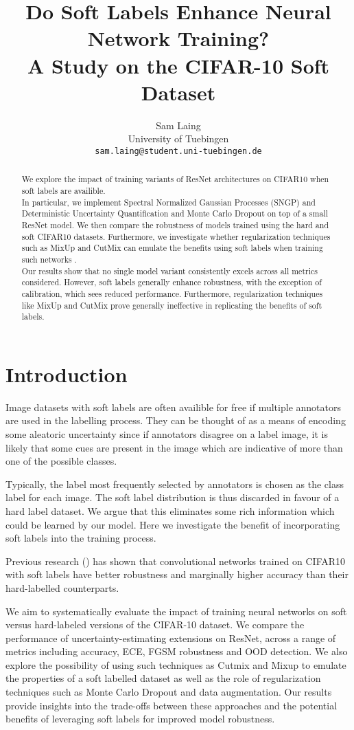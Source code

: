 \documentclass{article}
\title{Do Soft Labels Enhance Neural Network Training? \\ A Study on the CIFAR-10 Soft Dataset}
\author{
	Sam Laing \\
	University of Tuebingen\\
	\texttt{sam.laing@student.uni-tuebingen.de}
}
\begin{document}
\maketitle


\begin{abstract}
	We explore the impact of training variants of ResNet architectures on CIFAR10 when soft labels are availible.  \\
	In particular, we implement Spectral Normalized Gaussian Processes (SNGP) and Deterministic Uncertainty Quantification and Monte Carlo Dropout on top of a small ResNet model. We then compare the robustness of models trained using the hard and soft CIFAR10 datasets.
	Furthermore, we investigate whether regularization techniques such as MixUp and CutMix can emulate the benefits using soft labels when training such networks . \\
	Our results show that no single model variant consistently excels across all metrics considered. However, soft labels generally enhance robustness, with the exception of calibration, which sees reduced performance. Furthermore, regularization techniques like MixUp and CutMix prove generally ineffective in replicating the benefits of soft labels.
\end{abstract}
\section{Introduction}
Image datasets with soft labels are often availible for free if multiple annotators are used in the labelling process. They can be thought of as a means of encoding some aleatoric uncertainty since if annotators disagree on a label image, it is likely that some cues are present in the image which are indicative of more than one of the possible classes. 

Typically, the label most frequently selected by annotators is chosen as the class label for each image. The soft label distribution is thus discarded in favour of a hard label dataset. We argue that this eliminates some rich information which could be learned by our model. Here we investigate the benefit of incorporating soft labels into the training process. 

Previous research (\cite{peterson2019humanuncertaintymakesclassification}) has shown that convolutional networks trained on CIFAR10 with soft labels have better robustness and marginally higher accuracy than their hard-labelled counterparts. 

We aim to systematically evaluate the impact of training neural networks on soft versus hard-labeled versions of the CIFAR-10 dataset. We compare the performance of uncertainty-estimating extensions on ResNet, across a range of metrics including accuracy, ECE, FGSM robustness and OOD detection. We also explore the possibility of using such techniques as Cutmix and Mixup to emulate the properties of a soft labelled dataset as well as the role of regularization techniques such as Monte Carlo Dropout and data augmentation. Our results provide insights into the trade-offs between these approaches and the potential benefits of leveraging soft labels for improved model robustness.
\end{document}
